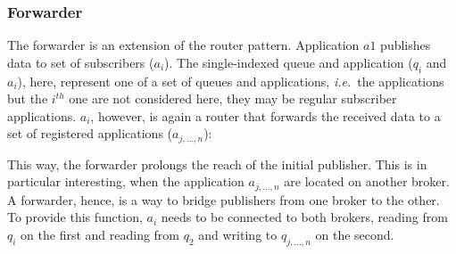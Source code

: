 \documentclass[a4paper]{scrartcl}
\newcommand\ie{\textit{i.e.}}
\newcommand{\menqAll}{\triangleleft}
\newcommand{\connect}[2]{
\draw [->,color=black] (#1) to (#2)
}
\begin{document}

\subsubsection{Forwarder}\label{subsub:forw}
The forwarder is an extension of the router pattern.
Application $a1$ publishes data to set of subscribers
($a_i$). The single-indexed queue and application
($q_i$ and $a_i$), here, represent one of a set
of queues and applications, \ie\ the applications
but the $i^{th}$ one are not considered here,
they may be regular subscriber applications.
$a_i$, however, is again a router that 
forwards the received data to a set of registered
applications ($a_{j, \dots, n}$):


This way, the forwarder prolongs the reach of the initial publisher.
This is in particular interesting, when the application $a_{j, \dots, n}$
are located on another broker. 
A forwarder, hence, is a way
to bridge publishers from one broker to the other.
To provide this function, $a_i$ needs to be connected 
to both brokers, 
reading from $q_i$ on the first
and reading from $q_2$ and writing to $q_{j, \dots, n}$
on the second.
\end{document}
